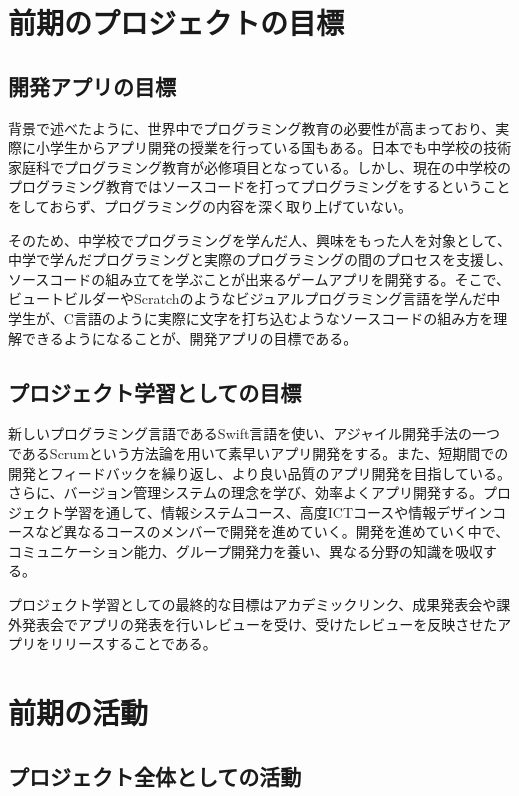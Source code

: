 \documentclass[openany,11pt,papersize]{jsbook}
\begin{document}
\chapter{前期のプロジェクトの目標}
\section{開発アプリの目標}
背景で述べたように、世界中でプログラミング教育の必要性が高まっており、実際に小学生からアプリ開発の授業を行っている国もある。日本でも中学校の技術家庭科でプログラミング教育が必修項目となっている。しかし、現在の中学校のプログラミング教育ではソースコードを打ってプログラミングをするということをしておらず、プログラミングの内容を深く取り上げていない。
\par
そのため、中学校でプログラミングを学んだ人、興味をもった人を対象として、中学で学んだプログラミングと実際のプログラミングの間のプロセスを支援し、ソースコードの組み立てを学ぶことが出来るゲームアプリを開発する。そこで、ビュートビルダーやScratchのようなビジュアルプログラミング言語を学んだ中学生が、C言語のように実際に文字を打ち込むようなソースコードの組み方を理解できるようになることが、開発アプリの目標である。

\section{プロジェクト学習としての目標}
新しいプログラミング言語であるSwift言語を使い、アジャイル開発手法の一つであるScrumという方法論を用いて素早いアプリ開発をする。また、短期間での開発とフィードバックを繰り返し、より良い品質のアプリ開発を目指している。さらに、バージョン管理システムの理念を学び、効率よくアプリ開発する。プロジェクト学習を通して、情報システムコース、高度ICTコースや情報デザインコースなど異なるコースのメンバーで開発を進めていく。開発を進めていく中で、コミュニケーション能力、グループ開発力を養い、異なる分野の知識を吸収する。
\par
プロジェクト学習としての最終的な目標はアカデミックリンク、成果発表会や課外発表会でアプリの発表を行いレビューを受け、受けたレビューを反映させたアプリをリリースすることである。

\chapter{前期の活動}

\section{プロジェクト全体としての活動}
\end{document}
